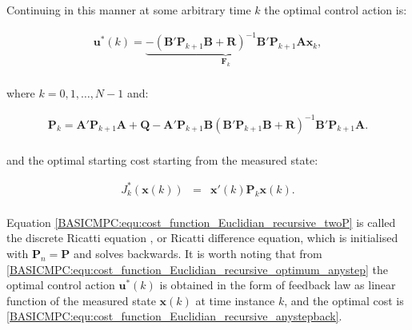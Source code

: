     Continuing in this manner at some arbitrary time $k$ the optimal control action is:

    \begin{equation}
        \begin{array}{rcl}
        \textbf{u}^*(k)=\underbrace{-(\textbf{B}'\textbf{P}_{k+1}\textbf{B}+\textbf{R})^{-1}\textbf{B}'\textbf{P}_{k+1}\textbf{A}}_{\textbf{F}_{k}}\textbf{x}_{k},\\
        \end{array}
        \label{BASICMPC:equ:cost_function_Euclidian_recursive_optimum_anystep}
    \end{equation}

    where $k=0,1,\dots,N-1$ and:

    \begin{equation}
        \begin{array}{rcl}
        \textbf{P}_{k}=\textbf{A}'\textbf{P}_{k+1}\textbf{A}+\textbf{Q}-\textbf{A}'\textbf{P}_{k+1}\textbf{B}(\textbf{B}'\textbf{P}_{k+1}\textbf{B}+\textbf{R})^{-1}\textbf{B}'\textbf{P}_{k+1}\textbf{A}.\\
        \end{array}
        \label{BASICMPC:equ:cost_function_Euclidian_recursive_twoP}
    \end{equation}

    and the optimal starting cost starting from the measured state:

     \begin{equation}
        \begin{array}{rcl}
        J^*_{k}(\textbf{x}(k))&=&\textbf{x}'(k)\textbf{P}_{k}\textbf{x}(k).\\
        \end{array}
        \label{BASICMPC:equ:cost_function_Euclidian_recursive_anystepback}
    \end{equation}

    Equation \ref{BASICMPC:equ:cost_function_Euclidian_recursive_twoP} is called the discrete Ricatti equation \cite{borrelli2017predictive}, or Ricatti difference equation, which is initialised with $\textbf{P}_n=\textbf{P}$ and solves backwards. It is worth noting that from \ref{BASICMPC:equ:cost_function_Euclidian_recursive_optimum_anystep} the optimal control action $\textbf{u}^*(k)$ is obtained in the form of feedback law as linear function of the measured state $\textbf{x}(k)$ at time instance $k$, and the optimal cost is \ref{BASICMPC:equ:cost_function_Euclidian_recursive_anystepback}.

